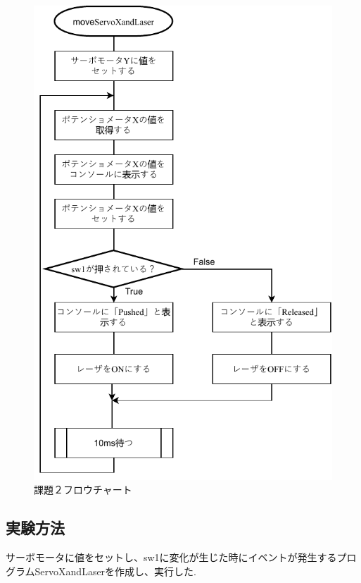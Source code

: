 \documentclass{jarticle}
\begin{document}
\begin{figure}[H]
    \centering
    \includegraphics{kumikomi_flow_2.pdf}
    \caption{課題２フロウチャート}
    \label{fig:my_label}
\end{figure}

\subsection{実験方法}
サーボモータに値をセットし、sw1に変化が生じた時にイベントが発生するプログラムServoXandLaserを作成し、実行した.
\end{document}

